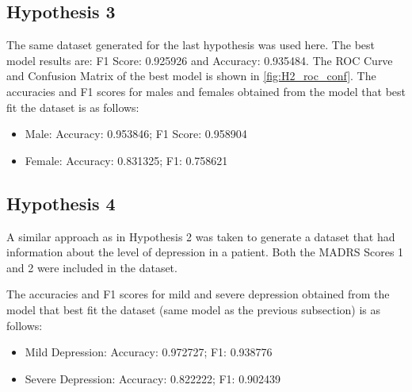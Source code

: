\documentclass[11pt,a4paper]{article}
\newcommand{\noi}{\noindent}
\begin{document}
\subsection{Hypothesis 3}
The same dataset generated for the last hypothesis was used here. The best model results are: F1 Score: 0.925926 and Accuracy: 0.935484. The ROC Curve and Confusion Matrix of the best model is shown in \autoref{fig:H2_roc_conf}. The accuracies and F1 scores for males and females obtained from the model that best fit the dataset is as follows:
\begin{itemize}
	\itemsep0em
	\item Male: Accuracy: 0.953846; F1 Score: 0.958904
	\item Female: Accuracy: 0.831325; F1: 0.758621
\end{itemize}

\subsection{Hypothesis 4}
A similar approach as in Hypothesis 2 was taken to generate a dataset that had information about the level of depression in a patient. Both the MADRS Scores 1 and 2 were included in the dataset. 

\noi
The accuracies and F1 scores for mild and severe depression obtained from the model that best fit the dataset (same model as the previous subsection) is as follows:
\begin{itemize}
	\itemsep0em
	\item Mild Depression: Accuracy: 0.972727; F1: 0.938776
	\item Severe Depression: Accuracy: 0.822222; F1: 0.902439
\end{itemize}
\end{document}
